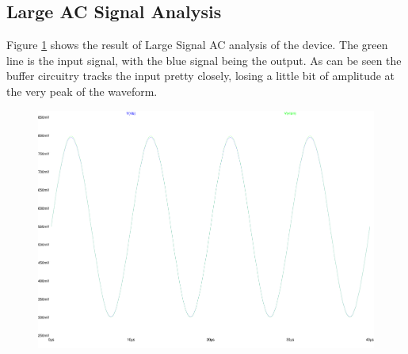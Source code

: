 \subsection{Large AC Signal Analysis}

Figure \ref{fig:Lac} shows the result of Large Signal AC analysis of the device.
The green line is the input signal, with the blue signal being the output.
As can be seen the buffer circuitry tracks the input pretty closely, losing a little bit of amplitude at the very peak of the waveform.

\begin{figure}[H]
	\centering
	\includegraphics[width=\textwidth]{./images/LargeSignal-both.pdf}
	\caption{}
	\label{fig:Lac}
\end{figure}
